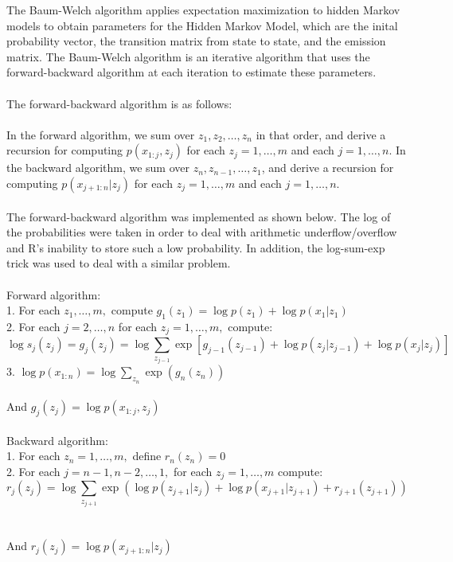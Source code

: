 \documentclass{article}
\begin{document}
The Baum-Welch algorithm applies expectation maximization to hidden Markov models to obtain parameters for the Hidden Markov Model, which are the inital probability vector, the transition matrix from state to state, and the emission matrix. The Baum-Welch algorithm is an iterative algorithm that uses the forward-backward algorithm at each iteration to estimate these parameters.  \\ 
\\ 
The forward-backward algorithm is as follows: \\
\\ 
In the forward algorithm, we sum over $z_1, z_2, \hdots, z_n$ in that order, and derive a recursion for computing $p(x_{1:j}, z_j)$ for each $z_j = 1,\hdots,m$ and each $j = 1,\hdots,n$. In the backward algorithm, we sum over $z_n, z_{n-1}, \hdots, z_1$, and derive a recursion for computing $p(x_{j+1:n} | z_j)$ for each $z_j = 1,\hdots,m$ and each $j = 1,\hdots,n$. \\ 
\\ 
The forward-backward algorithm was implemented as shown below. The log of the probabilities were taken in order to deal with arithmetic underflow/overflow and R's inability to store such a low probability. In addition, the log-sum-exp trick was used to deal with a similar problem. \\
\\
Forward algorithm: \\ 
1. For each $z_1,\hdots, m,$ compute $g_1(z_1) = \log p(z_1) + \log p(x_1 | z_1)$ \\ 
2. For each $j = 2, \hdots, n$ for each $z_j = 1,\hdots, m,$ compute:
$$\log s_j(z_j) = g_j(z_j) = \log \sum_{z_{j-1}} \exp [g_{j-1}(z_{j-1}) + \log p(z_j | z_{j-1}) + \log p(x_j|z_j) ] $$
3. $\log p(x_{1:n}) = \log \sum_{z_n} \exp(g_n(z_n))$ \\ 
\\
And $g_j(z_j) = \log p(x_{1:j}, z_j)$ \\
\\ 
Backward algorithm: \\ 
1. For each $z_n = 1,\hdots, m,$ define $r_n(z_n) = 0$ \\ 
2. For each $j = n - 1, n - 2, \hdots, 1,$ for each $z_j = 1,\hdots,m$ compute:
$$r_j(z_j) = \log \sum_{z_{j+1}} \exp (\log p(z_{j+1}|z_j) + \log p(x_{j+1}|z_{j+1}) + r_{j+1} (z_{j+1}))$$ \\ 
\\ 
And $r_j(z_j) = \log p(x_{j+1:n}|z_j)$ \\ 
\\ 
\end{document}
